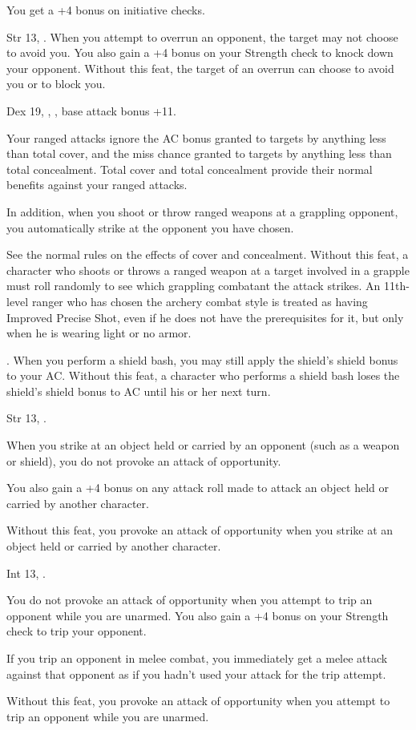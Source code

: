 {}
{You get a +4 bonus on initiative checks.}

{}
{Str 13, .}
{When you attempt to overrun an opponent, the target may not choose to avoid you. You also gain a +4 bonus on your Strength check to knock down your opponent.}
{Without this feat, the target of an overrun can choose to avoid you or to block you.}{}

{}
{Dex 19, , , base attack bonus +11.}
{Your ranged attacks ignore the AC bonus granted to targets by anything less than total cover, and the miss chance granted to targets by anything less than total concealment. Total cover and total concealment provide their normal benefits against your ranged attacks.

In addition, when you shoot or throw ranged weapons at a grappling opponent, you automatically strike at the opponent you have chosen.}
{See the normal rules on the effects of cover and concealment. Without this feat, a character who shoots or throws a ranged weapon at a target involved in a grapple must roll randomly to see which grappling combatant the attack strikes.}
{An 11th-level ranger who has chosen the archery combat style is treated as having Improved Precise Shot, even if he does not have the prerequisites for it, but only when he is wearing light or no armor.}

{}
{.}
{When you perform a shield bash, you may still apply the shield's shield bonus to your AC.}
{Without this feat, a character who performs a shield bash loses the shield's shield bonus to AC until his or her next turn.}{}

{}
{Str 13, .}
{When you strike at an object held or carried by an opponent (such as a weapon or shield), you do not provoke an attack of opportunity.

You also gain a +4 bonus on any attack roll made to attack an object held or carried by another character.}
{Without this feat, you provoke an attack of opportunity when you strike at an object held or carried by another character.}{}

{}
{Int 13, .}
{You do not provoke an attack of opportunity when you attempt to trip an opponent while you are unarmed. You also gain a +4 bonus on your Strength check to trip your opponent.

If you trip an opponent in melee combat, you immediately get a melee attack against that opponent as if you hadn't used your attack for the trip attempt.}
{Without this feat, you provoke an attack of opportunity when you attempt to trip an opponent while you are unarmed.}{}

